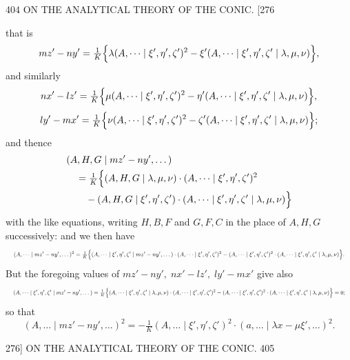 \documentclass[11pt]{article}
\begin{document}
\begin{center}
404 \hfill ON THE ANALYTICAL THEORY OF THE CONIC. \hfill \textsc{[276}
\end{center}

that is
\[ mz'-ny'=\tfrac{1}{K}\Bigl\{\lambda(A,\dots \mid \xi',\eta',\zeta')^{2}-\xi'(A,\dots \mid \xi',\eta',\zeta' \mid \lambda,\mu,\nu)\Bigr\}, \]
and similarly
\[ nx'-lz'=\tfrac{1}{K}\Bigl\{\mu(A,\dots \mid \xi',\eta',\zeta')^{2}-\eta'(A,\dots \mid \xi',\eta',\zeta' \mid \lambda,\mu,\nu)\Bigr\}, \]
\[ ly'-mx'=\tfrac{1}{K}\Bigl\{\nu(A,\dots \mid \xi',\eta',\zeta')^{2}-\zeta'(A,\dots \mid \xi',\eta',\zeta' \mid \lambda,\mu,\nu)\Bigr\}; \]
and thence
\[ \begin{aligned}
&(A,H,G \mid mz'-ny',\dots)\\
&\quad =\tfrac{1}{K}\Bigl\{(A,H,G \mid \lambda,\mu,\nu)\cdot(A,\dots \mid \xi',\eta',\zeta')^{2}\\
&\qquad -(A,H,G \mid \xi',\eta',\zeta')\cdot(A,\dots \mid \xi',\eta',\zeta' \mid \lambda,\mu,\nu)\Bigr\}
\end{aligned} \]
with the like equations, writing $H,B,F$ and $G,F,C$ in the place of $A,H,G$
successively: and we then have
\[ \resizebox{\textwidth}{!}{$\displaystyle
(A,\dots \mid mz'-ny',\dots)^{2}
=\tfrac{1}{K}\Bigl\{(A,\dots \mid \xi',\eta',\zeta' \mid mz'-ny',\dots)\cdot(A,\dots \mid \xi',\eta',\zeta')^{2}
-(A,\dots \mid \xi',\eta',\zeta')^{2}\cdot(A,\dots \mid \xi',\eta',\zeta' \mid \lambda,\mu,\nu)\Bigr\}.$} \]
But the foregoing values of $mz'-ny',\;nx'-lz',\;ly'-mx'$ give also
\[ \resizebox{\textwidth}{!}{$\displaystyle
(A,\dots \mid \xi',\eta',\zeta' \mid mz'-ny',\dots)
=\tfrac{1}{K}\Bigl\{(A,\dots \mid \xi',\eta',\zeta' \mid \lambda,\mu,\nu)\cdot(A,\dots \mid \xi',\eta',\zeta')^{2}-(A,\dots \mid \xi',\eta',\zeta')^{2}\cdot(A,\dots \mid \xi',\eta',\zeta' \mid \lambda,\mu,\nu)\Bigr\}=0;$} \]
so that
\[ (A,\dots \mid mz'-ny',\dots)^{2}=-\tfrac{1}{K}(A,\dots \mid \xi',\eta',\zeta')^{2}\cdot(a,\dots \mid \lambda x-\mu\xi',\dots)^{2}. \]

\begin{center}
\textsc{276]} \hfill ON THE ANALYTICAL THEORY OF THE CONIC. \hfill 405
\end{center}
\end{document}
